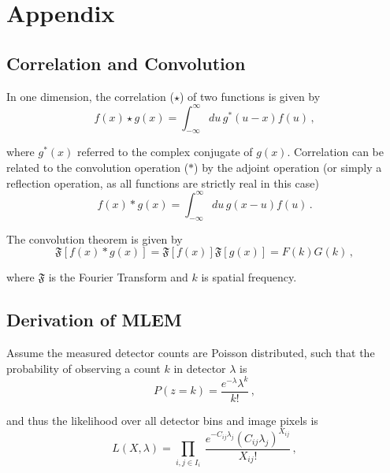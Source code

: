 \documentclass[10pt]{article}
\begin{document}
\section{Appendix}

\subsection{Correlation and Convolution}

In one dimension, the correlation ($\star$) of two functions is given by
%
\begin{equation} \tag{A.1}
	f(x) \star g(x) = \int_{-\infty}^\infty du\,g^\ast(u-x)f(u)\,,
\end{equation}

\noindent where $g^\ast(x)$ referred to the complex conjugate of $g(x)$. Correlation can be related to the convolution operation ($\ast$) by the adjoint operation (or simply a reflection operation, as all functions are strictly real in this case)
%
\begin{equation} \tag{A.2}
	f(x) \ast g(x) = \int_{-\infty}^\infty du\,g(x-u)f(u)\,.
\end{equation}

\noindent The convolution theorem is given by
%
\begin{equation} \tag{A.3}
	\mathfrak{F}[f(x) \ast g(x)] = \mathfrak{F}[f(x)] \mathfrak{F}[g(x)] = F(k)G(k)\,,
\end{equation}

\noindent where $\mathfrak{F}$ is the Fourier Transform and $k$ is spatial frequency.


\subsection{Derivation of MLEM}

Assume the measured detector counts are Poisson distributed, such that the probability of observing a count $k$ in detector $\lambda$ is 
%
\begin{equation} \tag{B.1}
	P(z=k)  = \frac{e^{-\lambda} \lambda^k}{k!}\,,
\end{equation}

\noindent and thus the likelihood over all detector bins and image pixels is 
%
\begin{equation} \tag{B.2}
	L(X,\lambda) = \prod_{i,j\in I_i} \ \frac{e^{-C_{ij}\lambda_j} (C_{ij}\lambda_j)^{X_{ij}}}{X_{ij}!}\,,
\end{equation}
\end{document}
